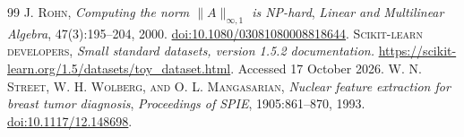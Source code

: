 \documentclass[final,leqno,letterpaper]{etna}
\begin{document}
\begin{thebibliography}{99}
 \textsc{J. Rohn}, \emph{Computing the norm $\|A\|_{\infty,1}$ is NP-hard}, \emph{Linear and Multilinear Algebra}, 47(3):195--204, 2000. \href{https://doi.org/10.1080/03081080008818644}{doi:10.1080/03081080008818644}.
 \textsc{Scikit-learn developers}, \emph{Small standard datasets, version 1.5.2 documentation.} \url{https://scikit-learn.org/1.5/datasets/toy_dataset.html}. Accessed 17 October 2026.
 \textsc{W. N. Street, W. H. Wolberg, and O. L. Mangasarian}, \emph{Nuclear feature extraction for breast tumor diagnosis}, \emph{Proceedings of SPIE}, 1905:861--870, 1993. \href{https://doi.org/10.1117/12.148698}{doi:10.1117/12.148698}.
\end{thebibliography}
\end{document}
